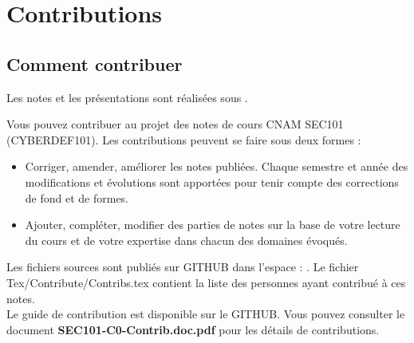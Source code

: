 
\section{Contributions}

\subsection{Comment contribuer}

Les notes et les présentations sont réalisées sous . 

Vous pouvez contribuer au projet des notes de cours CNAM SEC101 (CYBERDEF101). Les contributions peuvent se faire sous deux formes :

\begin{itemize}
  \item Corriger, amender, améliorer les notes publiées. Chaque semestre et année des modifications et évolutions sont apportées pour tenir compte des corrections de fond et de formes. 
  \item Ajouter, compléter, modifier des parties de notes sur la base de votre lecture du cours et de votre expertise dans chacun des domaines évoqués.
\end{itemize}

 Les fichiers sources sont publiés sur GITHUB dans l'espace : .
 Le fichier Tex/Contribute/Contribs.tex contient la liste des personnes ayant contribué à ces notes.
 \\Le guide de contribution est disponible sur le GITHUB.
Vous pouvez consulter le document \textbf{SEC101-C0-Contrib.doc.pdf} pour les détails de contributions.
